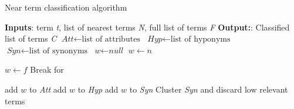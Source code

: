 \documentclass[Journal,InsideFigs, DoubleSpace]{ascelike} %
\begin{document}
{\begin{algorithm}[h]
	\caption{Near term classification algorithm}\label{alg:term_class}
	\begin{algorithmic}[1]
		\State \textbf{Inputs}: term \textit{t}, list of nearest terms \textit{N}, full list of terms \textit{F}
		\State \textbf{Output:}: Classified list of terms \textit{C}
		\State $\textit{Att} \gets \text{list of attributes}$
		\State $\textit{Hyp} \gets \text{list of hyponyms}$
		\State $\textit{Syn} \gets \text{list of synonyms}$
		\State $\textit{w} \gets \textit{null}$
		\State $w \gets n$
		
		\Else
		\State $w \gets f$	
		\State Break for
		
		\EndIf
		\EndFor
		\EndIf
		
		\State add $w$ to \textit{Att}
		\State add $w$ to \textit{Hyp}
		\Else
		\State add $w$ to \textit{Syn}
		\EndIf
		\EndFor
		\State Cluster \textit{Syn} and discard low relevant terms
		

\end{algorithmic}
\end{algorithm}}
\end{document}
